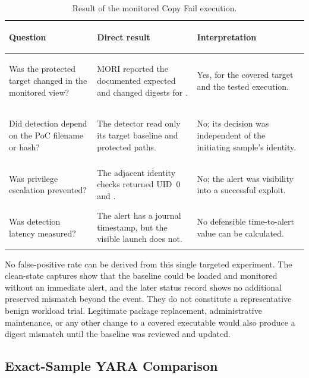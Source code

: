 \begin{table}[H]
    \centering
    \caption{Result of the monitored Copy Fail execution.}
    \label{tab:mori-detection-result}
    \small
    \begin{tabularx}{\textwidth}{@{}>{\bfseries\raggedright\arraybackslash}p{}>{\raggedright\arraybackslash}p{}Y@{}}
        \toprule
        Question & Direct result & Interpretation \\
        \midrule
        Was the protected target changed in the monitored view? &
        MORI reported the documented expected and changed digests for
        . &
        Yes, for the covered target and the tested execution. \\

        Did detection depend on the PoC filename or hash? &
        The detector read only its target baseline and protected paths. &
        No; its decision was independent of the initiating sample's identity. \\

        Was privilege escalation prevented? &
        The adjacent identity checks returned UID~0 and . &
        No; the alert was visibility into a successful exploit. \\

        Was detection latency measured? &
        The alert has a journal timestamp, but the visible launch does not. &
        No defensible time-to-alert value can be calculated. \\
        \bottomrule
    \end{tabularx}
\end{table}

No false-positive rate can be derived from this single targeted experiment.
The clean-state captures show that the baseline could be loaded and monitored
without an immediate alert, and the later status record shows no additional
preserved mismatch beyond the  event. They do not constitute
a representative benign workload trial. Legitimate package replacement,
administrative maintenance, or any other change to a covered executable would
also produce a digest mismatch until the baseline was reviewed and updated.

\clearpage

\subsection{Exact-Sample YARA Comparison}

